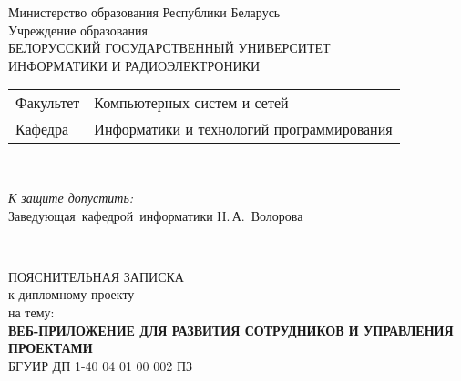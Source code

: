 \begin{titlepage}
  \begin{center}
    Министерство образования Республики Беларусь\\[1em]
    Учреждение образования\\
    БЕЛОРУССКИЙ ГОСУДАРСТВЕННЫЙ УНИВЕРСИТЕТ \\
    ИНФОРМАТИКИ И РАДИОЭЛЕКТРОНИКИ\\[1em]

    \begin{minipage}{\textwidth}
      \begin{flushleft}
        \begin{tabular}{ l l }
          Факультет & Компьютерных систем и сетей\\
          Кафедра   & Информатики и технологий программирования
        \end{tabular}
      \end{flushleft}
    \end{minipage}\\[1em]

    \begin{flushright}
      \begin{minipage}{0.4\textwidth}
        \textit{К защите допустить:}\\[1.8em]
        \mbox{Заведующая кафедрой информатики\\[0.45em]}
        \underline{\hspace*{2.8cm}} Н.\,А.~Волорова
      \end{minipage}\\[2.2em]
    \end{flushright}

    {ПОЯСНИТЕЛЬНАЯ ЗАПИСКА}\\
    {к дипломному проекту}\\
    {на тему:}\\[1em]
    \textbf{\large \MakeUppercase{Веб-приложение для развития сотрудников и управления проектами}}\\[1em]


    {БГУИР ДП 1-40 04 01 00 002 ПЗ}\\[2em]
    

\end{center}
\end{titlepage}
